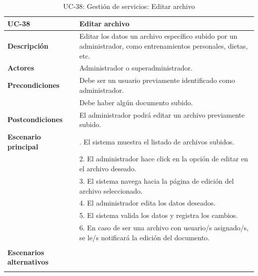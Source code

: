 \begin{table}
  \begin{center}
    \begin{tabularx}{16.4cm}{|l|X|}
      \hline
      \textbf{UC-38} & \textbf{Editar archivo}\\
      \hline
      \textbf{Descripción} & Editar los datos un archivo específico subido por un administrador, como entrenamientos personales, dietas, etc. \\
      \hline
      \textbf{Actores} & Administrador o superadministrador.\\
      \hline
      \textbf{Precondiciones} & Debe ser un usuario previamente identificado como administrador.\\
      & Debe haber algún documento subido.\\
      \hline
      \textbf{Postcondiciones} & El administrador podrá editar un archivo previamente subido.\\
      \hline
      \textbf{Escenario principal} & \smallskip 1. El sistema muestra el listado de archivos subidos.\\
      & 2. El administrador hace click en la opción de editar en el archivo deseado.\\
      & 3. El sistema navega hacia la página de edición del archivo seleccionado.\\
      & 4. El administrador edita los datos deseados.\\
      & 5. El sistema valida los datos y registra los cambios.\\
      & 6. En caso de ser una archivo con usuario/s asignado/s, se le/s notificará la edición del documento.\\
      & \\
      \hline
      \textbf{Escenarios alternativos} & \\
      & \\
      \hline
    \end{tabularx}
    \caption{UC-38: Gestión de servicios: Editar archivo}
    \label{tab:CU-editar-archivo}
  \end{center}
\end{table}


